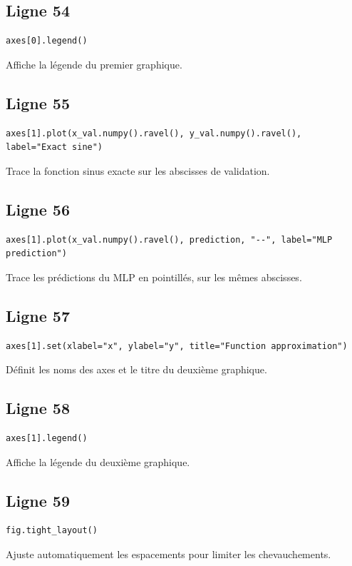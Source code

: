 \documentclass[11pt,a4paper]{article}
\begin{document}
\subsection*{Ligne 54}
\begin{lstlisting}
axes[0].legend()
\end{lstlisting}
Affiche la légende du premier graphique.

\subsection*{Ligne 55}
\begin{lstlisting}
axes[1].plot(x_val.numpy().ravel(), y_val.numpy().ravel(), label="Exact sine")
\end{lstlisting}
Trace la fonction sinus exacte sur les abscisses de validation.

\subsection*{Ligne 56}
\begin{lstlisting}
axes[1].plot(x_val.numpy().ravel(), prediction, "--", label="MLP prediction")
\end{lstlisting}
Trace les prédictions du MLP en pointillés, sur les mêmes abscisses.

\subsection*{Ligne 57}
\begin{lstlisting}
axes[1].set(xlabel="x", ylabel="y", title="Function approximation")
\end{lstlisting}
Définit les noms des axes et le titre du deuxième graphique.

\subsection*{Ligne 58}
\begin{lstlisting}
axes[1].legend()
\end{lstlisting}
Affiche la légende du deuxième graphique.

\subsection*{Ligne 59}
\begin{lstlisting}
fig.tight_layout()
\end{lstlisting}
Ajuste automatiquement les espacements pour limiter les chevauchements.
\end{document}
